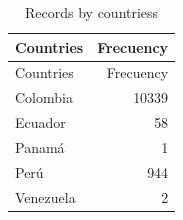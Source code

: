 \documentclass[preprint, 3p,
authoryear]{elsarticle} %
\begin{document}
\begin{longtable}[]{@{}lr@{}}
\caption{\label{tab1}Records by countriess}\tabularnewline
\toprule\noalign{}
Countries & Frecuency \\
\midrule\noalign{}
\endfirsthead
\toprule\noalign{}
Countries & Frecuency \\
\midrule\noalign{}
\endhead
\bottomrule\noalign{}
\endlastfoot
Colombia & 10339 \\
Ecuador & 58 \\
Panamá & 1 \\
Perú & 944 \\
Venezuela & 2 \\
\end{longtable}


\end{document}
